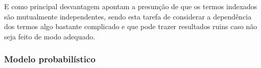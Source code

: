     E como principal desvantagem apontam a presunção de que os termos indexados são mutualmente independentes, sendo esta tarefa de considerar a dependência dos termos algo bastante complicado e que pode trazer resultados ruins caso não seja feito de modo adequado.

\subsubsection{Modelo probabilístico}  \label{subsubsec:Modelo-probabilístico}

